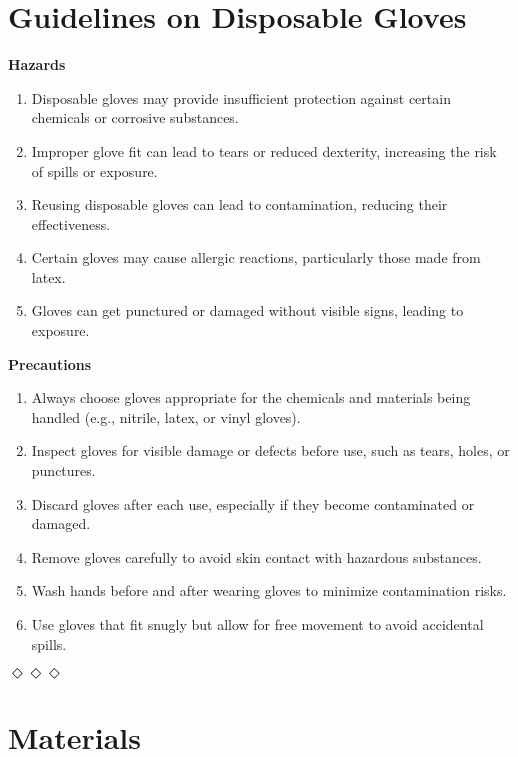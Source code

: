 \documentclass{report}
\begin{document}
\section*{Guidelines on Disposable Gloves}{
	\textbf{Hazards}
	\begin{enumerate}
		\item Disposable gloves may provide insufficient protection against certain chemicals or corrosive substances.
		\item Improper glove fit can lead to tears or reduced dexterity, increasing the risk of spills or exposure.
		\item Reusing disposable gloves can lead to contamination, reducing their effectiveness.
		\item Certain gloves may cause allergic reactions, particularly those made from latex.
		\item Gloves can get punctured or damaged without visible signs, leading to exposure.
	\end{enumerate}
	\textbf{Precautions}
	\begin{enumerate}
		\item Always choose gloves appropriate for the chemicals and materials being handled (e.g., nitrile, latex, or vinyl gloves).
		\item Inspect gloves for visible damage or defects before use, such as tears, holes, or punctures.
		\item Discard gloves after each use, especially if they become contaminated or damaged.
		\item Remove gloves carefully to avoid skin contact with hazardous substances.
		\item Wash hands before and after wearing gloves to minimize contamination risks.
		\item Use gloves that fit snugly but allow for free movement to avoid accidental spills.
	\end{enumerate}
}

\bigskip
\centerline{$\Diamond\Diamond\Diamond$} %
\bigskip

\section*{Materials}
\end{document}
